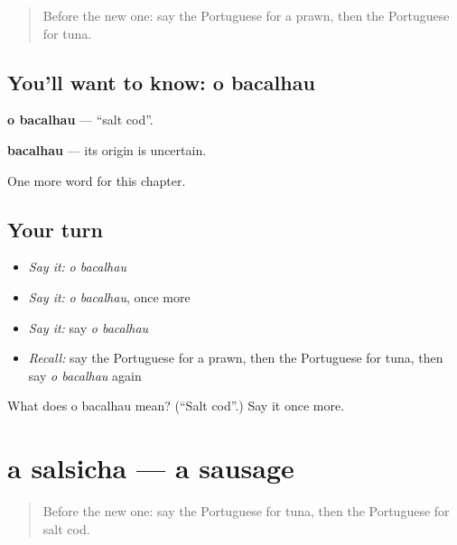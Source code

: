 \label{lesson:PT-C254-bacalhau}



\begin{quote}
Before the new one: say the Portuguese for a prawn, then the Portuguese for tuna.
\end{quote}

\subsection*{You'll want to know: o bacalhau}
\textbf{o bacalhau} — \textquotedblleft{}salt cod\textquotedblright{}.

\begin{cousinweb}
\textbf{bacalhau} — its origin is uncertain.
\end{cousinweb}

\begin{grammarlens}[title={What you've built}]
One more word for this chapter.
\end{grammarlens}

\subsection*{Your turn}
\begin{itemize}
\raggedright
  \item \emph{Say it:} \emph{o bacalhau}
  \item \emph{Say it:} \emph{o bacalhau}, once more
  \item \emph{Say it:} say \emph{o bacalhau}
  \item \emph{Recall:} say the Portuguese for a prawn, then the Portuguese for tuna, then say \emph{o bacalhau} again
\end{itemize}

\begin{tcolorbox}[breakable,colback=teal!4,colframe=teal!35!black,title={Before you move on}]
What does o bacalhau mean? (\textquotedblleft{}Salt cod\textquotedblright{}.) Say it once more.
\end{tcolorbox}
\section[a salsicha]{a salsicha — a sausage}

\label{lesson:PT-C254-salsicha}



\begin{quote}
Before the new one: say the Portuguese for tuna, then the Portuguese for salt cod.
\end{quote}

